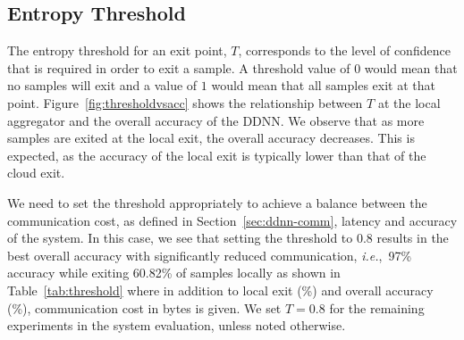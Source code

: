 \documentclass[10pt, conference, compsocconf]{IEEEtran}
\newcommand{\ie}{\emph{i.e.}}
\begin{document}


\subsection{Entropy Threshold}
\label{sec:entropy}
The entropy threshold for an exit point, $T$, corresponds to the level of confidence that is required in order to exit a sample. A threshold value of $0$ would mean that no samples will exit and a value of $1$ would mean that all samples exit at that point.  Figure~\ref{fig:thresholdvsacc} shows the relationship between $T$ at the local aggregator and the overall accuracy of the DDNN. We observe that as more samples are exited at the local exit, the overall accuracy decreases. This is expected, as the accuracy of the local exit is typically lower than that of the cloud exit. 

We need to set the threshold appropriately to achieve a balance between the communication cost, as defined in Section~\ref{sec:ddnn-comm}, latency and accuracy of the system. In this case, we see that setting the threshold to $0.8$ results in the best overall accuracy with significantly reduced communication, \ie,~97\% accuracy while exiting 60.82\% of samples locally as shown in Table~\ref{tab:threshold} where in addition to local exit (\%) and overall accuracy (\%), communication cost in bytes is given. We set $T=0.8$ for the remaining experiments in the system evaluation, unless noted otherwise. 
\end{document}
